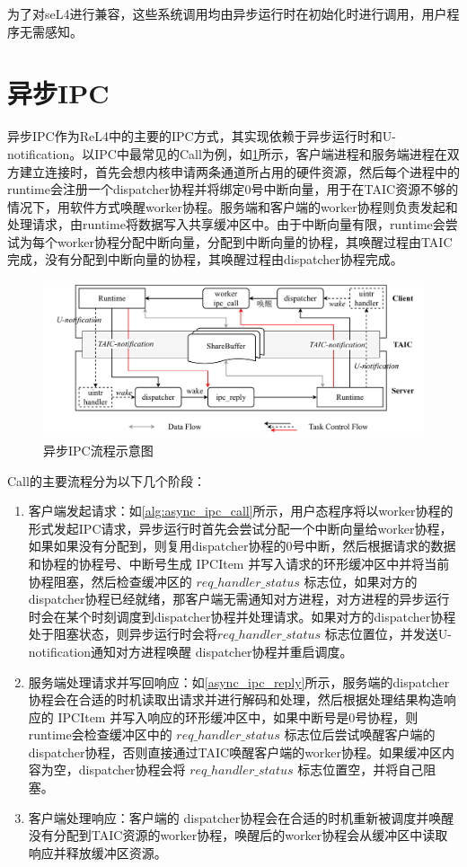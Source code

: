 为了对seL4进行兼容，这些系统调用均由异步运行时在初始化时进行调用，用户程序无需感知。

\section{异步IPC}

异步IPC作为ReL4中的主要的IPC方式，其实现依赖于异步运行时和U-notification。以IPC中最常见的Call为例，如\ref{fig:async_ipc}所示，客户端进程和服务端进程在双方建立连接时，首先会想内核申请两条通道所占用的硬件资源，然后每个进程中的runtime会注册一个dispatcher协程并将绑定0号中断向量，用于在TAIC资源不够的情况下，用软件方式唤醒worker协程。服务端和客户端的worker协程则负责发起和处理请求，由runtime将数据写入共享缓冲区中。由于中断向量有限，runtime会尝试为每个worker协程分配中断向量，分配到中断向量的协程，其唤醒过程由TAIC完成，没有分配到中断向量的协程，其唤醒过程由dispatcher协程完成。

\begin{figure}[htbp]
    \centering
    \includegraphics[width=1.0\textwidth]{figures/async_ipc.drawio.pdf}
    \caption{异步IPC流程示意图}\label{fig:async_ipc}
  \end{figure}

Call的主要流程分为以下几个阶段：
\begin{enumerate}
    \item 客户端发起请求：如\ref{alg:async_ipc_call}所示，用户态程序将以worker协程的形式发起IPC请求，异步运行时首先会尝试分配一个中断向量给worker协程，如果如果没有分配到，则复用dispatcher协程的0号中断，然后根据请求的数据和协程的协程号、中断号生成 IPCItem 并写入请求的环形缓冲区中并将当前协程阻塞，然后检查缓冲区的 $req\_handler\_status$ 标志位，如果对方的dispatcher协程已经就绪，那客户端无需通知对方进程，对方进程的异步运行时会在某个时刻调度到dispatcher协程并处理请求。如果对方的dispatcher协程处于阻塞状态，则异步运行时会将$req\_handler\_status$ 标志位置位，并发送U-notification通知对方进程唤醒 dispatcher协程并重启调度。
    \item 服务端处理请求并写回响应：如\ref{async_ipc_reply}所示，服务端的dispatcher协程会在合适的时机读取出请求并进行解码和处理，然后根据处理结果构造响应的 IPCItem 并写入响应的环形缓冲区中，如果中断号是0号协程，则runtime会检查缓冲区中的 $req\_handler\_status$  标志位后尝试唤醒客户端的 dispatcher协程，否则直接通过TAIC唤醒客户端的worker协程。如果缓冲区内容为空，dispatcher协程会将 $req\_handler\_status$  标志位置空，并将自己阻塞。
    \item 客户端处理响应：客户端的 dispatcher协程会在合适的时机重新被调度并唤醒没有分配到TAIC资源的worker协程，唤醒后的worker协程会从缓冲区中读取响应并释放缓冲区资源。
\end{enumerate}

